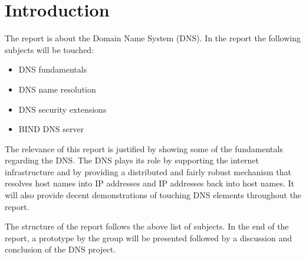 \chapter{Introduction}

The report is about the Domain Name System (DNS). In the report the following subjects will be touched:

\begin{itemize}
\item DNS fundamentals
\item DNS name resolution
\item DNS security extensions
\item BIND DNS server
\end{itemize}

The relevance of this report is justified by showing some of the fundamentals regarding the DNS.
The DNS plays its role by supporting the internet infrastructure and by providing a distributed and fairly robust mechanism that resolves host names into IP addresses and IP addresses back into host names. It will also provide decent demonstrations of touching DNS elements throughout the report.

The structure of the report follows the above list of subjects. In the end of the report, a prototype by the group will be presented followed by a discussion and conclusion of the DNS project.